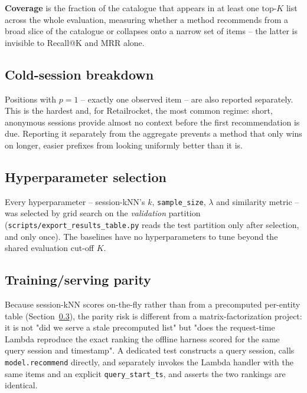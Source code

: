 \textbf{Coverage} is the fraction of the catalogue that appears in at least
one top-$K$ list across the whole evaluation, measuring whether a method
recommends from a broad slice of the catalogue or collapses onto a narrow
set of items -- the latter is invisible to Recall@K and MRR alone.

\subsection{Cold-session breakdown}

Positions with $p = 1$ -- exactly one observed item -- are also reported
separately. This is the hardest and, for Retailrocket, the most common
regime: short, anonymous sessions provide almost no context before the first
recommendation is due. Reporting it separately from the aggregate prevents a
method that only wins on longer, easier prefixes from looking uniformly
better than it is.

\subsection{Hyperparameter selection}

Every hyperparameter -- session-kNN's $k$, \texttt{sample\_size},
$\lambda$ and similarity metric -- was selected by grid search on the
\emph{validation} partition (\texttt{scripts/export\_results\_table.py} reads
the test partition only after selection, and only once). The baselines have
no hyperparameters to tune beyond the shared evaluation cut-off $K$.

\subsection{Training/serving parity}
\label{sec:serving}

Because session-kNN scores on-the-fly rather than from a precomputed
per-entity table (Section~\ref{sec:serving}), the parity risk is different
from a matrix-factorization project: it is not "did we serve a stale
precomputed list" but "does the request-time Lambda reproduce the exact
ranking the offline harness scored for the same query session and
timestamp". A dedicated test constructs a query session, calls
\texttt{model.recommend} directly, and separately invokes the Lambda handler
with the same items and an explicit \texttt{query\_start\_ts}, and asserts
the two rankings are identical.

